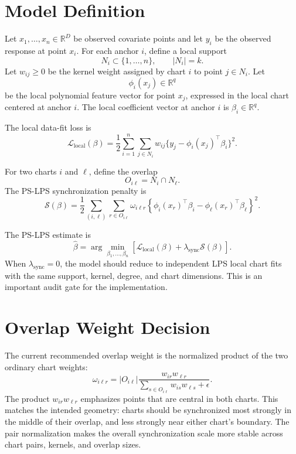 \documentclass[11pt]{article}
\newcommand{\R}{\mathbb{R}}
\begin{document}
\section{Model Definition}

Let \(x_1,\ldots,x_n\in\R^D\) be observed covariate points and let \(y_i\) be
the observed response at point \(x_i\).  For each anchor \(i\), define a local
support
\[
  N_i\subset\{1,\ldots,n\},
  \qquad |N_i|=k.
\]
Let \(w_{ij}\ge 0\) be the kernel weight assigned by chart \(i\) to point
\(j\in N_i\).  Let
\[
  \phi_i(x_j)\in\R^q
\]
be the local polynomial feature vector for point \(x_j\), expressed in the
local chart centered at anchor \(i\).  The local coefficient vector at anchor
\(i\) is \(\beta_i\in\R^q\).

The local data-fit loss is
\[
  \mathcal L_{\mathrm{local}}(\beta)
  =
  \frac12
  \sum_{i=1}^{n}
  \sum_{j\in N_i}
  w_{ij}
  \{y_j-\phi_i(x_j)^\top\beta_i\}^2.
\]

For two charts \(i\) and \(\ell\), define the overlap
\[
  O_{i\ell}=N_i\cap N_\ell.
\]
The PS-LPS synchronization penalty is
\[
  \mathcal S(\beta)
  =
  \frac12
  \sum_{(i,\ell)}
  \sum_{r\in O_{i\ell}}
  \omega_{i\ell r}
  \left\{
    \phi_i(x_r)^\top\beta_i
    -
    \phi_\ell(x_r)^\top\beta_\ell
  \right\}^2.
\]

The PS-LPS estimate is
\[
  \widehat\beta
  =
  \arg\min_{\beta_1,\ldots,\beta_n}
  \left[
    \mathcal L_{\mathrm{local}}(\beta)
    +
    \lambda_{\mathrm{sync}}\mathcal S(\beta)
  \right].
\]
When \(\lambda_{\mathrm{sync}}=0\), the model should reduce to independent LPS
local chart fits with the same support, kernel, degree, and chart dimensions.
This is an important audit gate for the implementation.

\section{Overlap Weight Decision}

The current recommended overlap weight is the normalized product of the two
ordinary chart weights:
\[
  \omega_{i\ell r}
  =
  |O_{i\ell}|
  \frac{
    w_{ir}w_{\ell r}
  }{
    \sum_{s\in O_{i\ell}} w_{is}w_{\ell s}+\epsilon
  }.
\]
The product \(w_{ir}w_{\ell r}\) emphasizes points that are central in both
charts.  This matches the intended geometry: charts should be synchronized most
strongly in the middle of their overlap, and less strongly near either chart's
boundary.  The pair normalization makes the overall synchronization scale more
stable across chart pairs, kernels, and overlap sizes.
\end{document}
